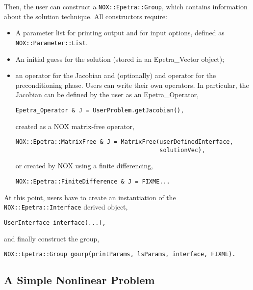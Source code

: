 Then, the user can construct a \verb!NOX::Epetra::Group!, which contains
information about the solution technique. All constructors require:
\begin{itemize}
\item A parameter list for printing output and for input options,
  defined as \verb!NOX::Parameter::List!. 
\item An initial guess for the solution (stored in an Epetra\_Vector
  object);
\item an operator for the Jacobian and (optionally) and operator for the
  preconditioning phase. Users can write their own operators. In
  particular, the Jacobian can be defined by the user as an
  Epetra\_Operator,
\begin{verbatim}
Epetra_Operator & J = UserProblem.getJacobian(),
\end{verbatim}
created as a NOX matrix-free operator,
\begin{verbatim}
NOX::Epetra::MatrixFree & J = MatrixFree(userDefinedInterface, 
                                         solutionVec),
\end{verbatim}
or created by NOX using a finite differencing,
\begin{verbatim}
NOX::Epetra::FiniteDifference & J = FIXME...
\end{verbatim}
\end{itemize}

At this point, users have to create an instantiation of the
\verb!NOX::Epetra::Interface! derived object,
\begin{verbatim}
UserInterface interface(...),
\end{verbatim}
and finally construct the group,
\begin{verbatim}
NOX::Epetra::Group gourp(printParams, lsParams, interface, FIXME).
\end{verbatim}





\subsection{A Simple Nonlinear Problem}
\label{sec:nox_simple}

